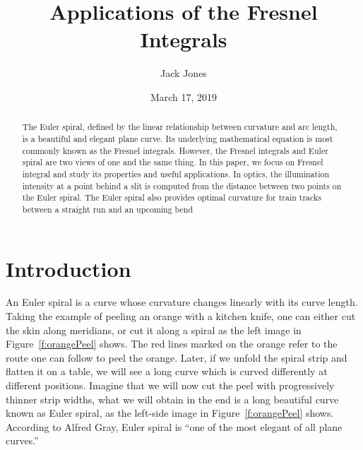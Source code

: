 \documentclass[12pt]{article}
\title{Applications of the Fresnel Integrals}
\author{Jack Jones}
\date{March 17\th, 2019}
\begin{document}
\maketitle
\begin{abstract}

The Euler spiral, defined by the linear relationship between curvature and arc length, is a beautiful and elegant plane curve. Its underlying mathematical equation is most
commonly known as the Fresnel integrals. However, the Fresnel integrals and Euler spiral are  two views of one and the same thing. In this paper, we focus on Fresnel integral and study its properties and useful applications. In optics, the illumination
intensity at a point behind a slit is computed from
the distance between two points on the Euler spiral. The Euler spiral also provides optimal curvature for train tracks between a straight run and
an upcoming bend


\end{abstract}
\clearpage


\section{Introduction}
An Euler spiral is a curve whose curvature changes linearly with its curve length. Taking the example of peeling an orange with a kitchen knife, one can either cut the skin along meridians, or cut it along a spiral as the left image in Figure~\ref{f:orangePeel} shows. The red lines marked on the orange refer to the route one can follow to peel the orange. Later, if we unfold the spiral strip and flatten it on a table, we will see a long curve which is curved differently at different positions. Imagine that we will now cut the peel with progressively thinner strip widths, what we will obtain in the end is a long beautiful curve known as Euler spiral, as the left-side image in Figure~\ref{f:orangePeel} shows. According to Alfred Gray, Euler spiral is “one of the most elegant of all plane curves.” \cite{ASG17}
\end{document}
